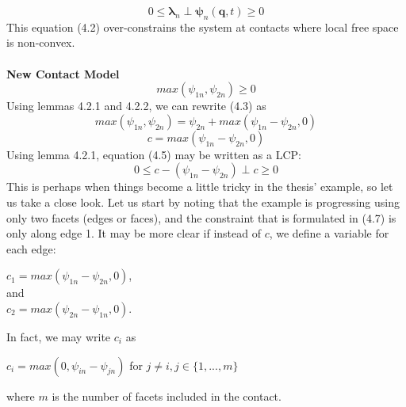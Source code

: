 \documentclass{article}
\begin{document}
\begin{equation}
0 \leq \mathbf{\lambda}_n \perp \mathbf{\psi}_n(\mathbf{q},t) \geq 0 \tag{4.2} 
\end{equation} This equation (4.2) over-constrains the system at contacts where local free space is non-convex.  \\ \\
\textbf{New Contact Model}
\begin{equation} max(\psi_{1n}, \psi_{2n}) \geq 0 \tag{4.3} \end{equation}
Using lemmas 4.2.1 and 4.2.2, we can rewrite (4.3) as 
\begin{equation}max(\psi_{1n}, \psi_{2n}) = \psi_{2n} + max(\psi_{1n} - \psi_{2n},0) \tag{4.4} \end{equation}
\begin{equation} c = max(\psi_{1n}-\psi_{2n},0) \tag{4.5} \end{equation}
Using lemma 4.2.1, equation (4.5) may be written as a LCP:
\begin{equation} 0 \leq c- (\psi_{1n} - \psi_{2n}) \perp c \geq 0  \tag{4.6} \end{equation}
This is perhaps when things become a little tricky in the thesis' example, so let us take a close look.  Let us start by noting that the example is progressing using only two facets (edges or faces), and the constraint that is formulated in (4.7) is only along edge 1.  It may be more clear if instead of $c$, we define a variable for each edge: 
\begin{center}
$c_1 = max(\psi_{1n}-\psi_{2n},0)$, \\ and  \\ $c_2 = max(\psi_{2n} - \psi_{1n},0)$. 
\end{center}
In fact, we may write $c_i$ as 
\begin{center}
$c_i = max(0,\psi_{in} - \psi_{jn})$ for $j \neq i, j \in \{1,...,m\}$ 
\end{center}
where $m$ is the number of facets included in the contact.
   
\end{document}
